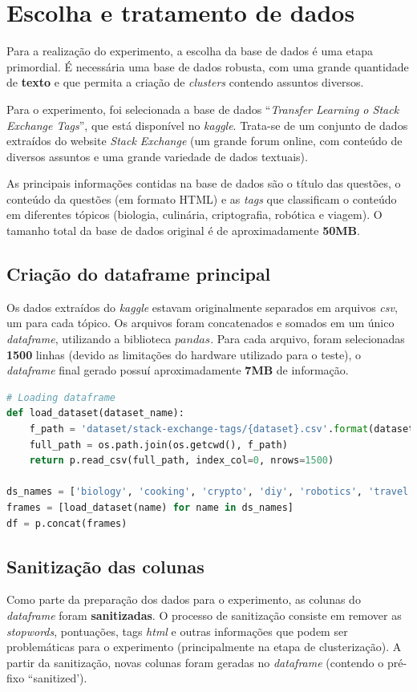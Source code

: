 \section{Escolha e tratamento de dados}
Para a realização do experimento, a escolha da base de dados é uma etapa primordial.
É necessária uma base de dados robusta, com uma grande quantidade de \textbf{texto} e que permita a criação de \emph{clusters} contendo assuntos diversos.

Para o experimento, foi selecionada a base de dados ``\emph{Transfer Learning o Stack Exchange Tags}'', que está disponível no \emph{kaggle}.
Trata-se de um conjunto de dados extraídos do website \emph{Stack Exchange} (um grande forum online, com conteúdo de diversos assuntos e uma grande variedade de dados textuais).

As principais informações contidas na base de dados são o título das questões, o conteúdo da questões (em formato HTML) e as \emph{tags} que classificam o conteúdo em diferentes tópicos (biologia, culinária, criptografia, robótica e viagem).
O tamanho total da base de dados original é de aproximadamente \textbf{50MB}. 

\subsection{Criação do dataframe principal}
Os dados extraídos do \emph{kaggle} estavam originalmente separados em arquivos \emph{csv}, um para cada tópico.
Os arquivos foram concatenados e somados em um único \emph{dataframe}, utilizando a biblioteca $pandas$.
Para cada arquivo, foram selecionadas \textbf{1500} linhas (devido as limitações do hardware utilizado para o teste), o \emph{dataframe} final gerado possuí aproximadamente \textbf{7MB} de informação.


\begin{lstlisting}[language=Python, caption=Carregando base de dados]
# Loading dataframe
def load_dataset(dataset_name):
    f_path = 'dataset/stack-exchange-tags/{dataset}.csv'.format(dataset = dataset_name)
    full_path = os.path.join(os.getcwd(), f_path)
    return p.read_csv(full_path, index_col=0, nrows=1500)

ds_names = ['biology', 'cooking', 'crypto', 'diy', 'robotics', 'travel']
frames = [load_dataset(name) for name in ds_names]
df = p.concat(frames)
\end{lstlisting}

\subsection{Sanitização das colunas}
Como parte da preparação dos dados para o experimento, as colunas do \emph{dataframe} foram \textbf{sanitizadas}.
O processo de sanitização consiste em remover as \emph{stopwords}, pontuações, tags \emph{html} e outras informações que podem ser problemáticas para o experimento (principalmente na etapa de clusterização).
A partir da sanitização, novas colunas foram geradas no \emph{dataframe} (contendo o pré-fixo ``sanitized').

